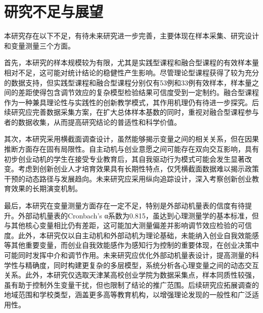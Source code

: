 \section{研究不足与展望}

本研究存在以下不足，有待未来研究进一步完善，主要体现在样本采集、研究设计和变量测量三个方面。

首先，本研究的样本规模较为有限，尤其是实践型课程和融合型课程的有效样本量相对不足，这可能对统计结论的稳健性产生影响。尽管理论型课程获得了较为充分的数据支持，但实践型课程和融合型课程分别仅有53例和33例有效样本，样本量之间的差距使得包含调节效应的复杂模型检验结果可信度受到一定制约。融合型课程作为一种兼具理论性与实践性的创新教学模式，其作用机理仍有待进一步探究。后续研究应完善数据采集方案，在扩大总体样本基数的同时，重视对融合型课程参与者的数据收集，从而提高研究结论的普适性和科学价值。

其次，本研究采用横截面调查设计，虽然能够揭示变量之间的相关关系，但在因果推断方面存在固有局限性。自主动机与创业意愿之间可能存在双向交互影响，具有初步创业动机的学生在接受专业教育后，其自我驱动行为模式可能会发生显著改变。考虑到创新创业人才培育效果具有长期性特点，仅凭横截面数据难以揭示政策干预的动态路径与发展趋向。未来研究应采用纵向追踪设计，深入考察创新创业教育效果的长期演变机制。

最后，本研究在变量测量方面存在一定不足，特别是外部动机量表的信度有待提升。外部动机量表的Cronbach's α系数为0.815，虽达到心理测量学的基本标准，但与其他核心变量相比仍有差距，这可能加大测量偏差并影响调节效应检验的可信度。此外，本研究仅以自主动机和外部动机为理论基础，未能纳入创业自我效能感等其他重要变量，而创业自我效能感作为感知行为控制的重要体现，在创业决策中可能同时发挥中介和调节作用。未来研究应优化外部动机量表设计，提高测量的科学性与精确度，同时构建更复杂的多层模型，系统分析各心理变量之间的动态交互关系。此外，本研究仅选取天津某高校创业学院为数据采集点，样本同质性较强，虽有助于控制外生变量干扰，但也限制了结论的推广范围。后续研究应拓展调查的地域范围和学校类型，涵盖更多高等教育机构，以增强理论发现的一般性和广泛适用性。

\clearpage
